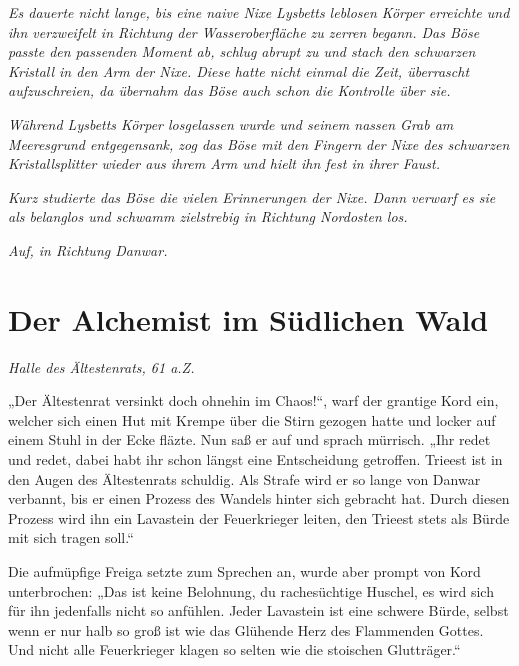 \textit{Es dauerte nicht lange, bis eine naive Nixe Lysbetts leblosen Körper erreichte und ihn verzweifelt in Richtung der Wasseroberfläche zu zerren begann. Das Böse passte den passenden Moment ab, schlug abrupt zu und stach den schwarzen Kristall in den Arm der Nixe. Diese hatte nicht einmal die Zeit, überrascht aufzuschreien, da übernahm das Böse auch schon die Kontrolle über sie.}

\textit{Während Lysbetts Körper losgelassen wurde und seinem nassen Grab am Meeresgrund entgegensank, zog das Böse mit den Fingern der Nixe des schwarzen Kristallsplitter wieder aus ihrem Arm und hielt ihn fest in ihrer Faust.}

\textit{Kurz studierte das Böse die vielen Erinnerungen der Nixe. Dann verwarf es sie als belanglos und schwamm zielstrebig in Richtung Nordosten los.}

\textit{Auf, in Richtung Danwar.}
















\newpage
\section{Der Alchemist im Südlichen Wald}





\textit{Halle des Ältestenrats, 61 a.Z.}\bigskip



„Der Ältestenrat versinkt doch ohnehin im Chaos!“, warf der grantige Kord ein, welcher sich einen Hut mit Krempe über die Stirn gezogen hatte und locker auf einem Stuhl in der Ecke fläzte. Nun saß er auf und sprach mürrisch. „Ihr redet und redet, dabei habt ihr schon längst eine Entscheidung getroffen. Trieest ist in den Augen des Ältestenrats schuldig. Als Strafe wird er so lange von Danwar verbannt, bis er einen Prozess des Wandels hinter sich gebracht hat. Durch diesen Prozess wird ihn ein Lavastein der Feuerkrieger leiten, den Trieest stets als Bürde mit sich tragen soll.“

Die aufmüpfige Freiga setzte zum Sprechen an, wurde aber prompt von Kord unterbrochen: „Das ist keine Belohnung, du rachesüchtige Huschel, es wird sich für ihn jedenfalls nicht so anfühlen. Jeder Lavastein ist eine schwere Bürde, selbst wenn er nur halb so groß ist wie das Glühende Herz des Flammenden Gottes. Und nicht alle Feuerkrieger klagen so selten wie die stoischen Glutträger.“

